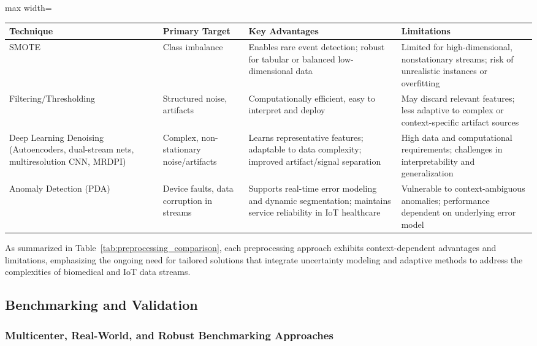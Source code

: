 \documentclass[sigconf]{acmart}
\begin{document}
\begin{table*}[htbp]
\centering
\caption{Comparison of Preprocessing Techniques for Biomedical and IoT Data}
\label{tab:preprocessing_comparison}
\begin{adjustbox}{max width=\textwidth}
\begin{tabular}{@{}llll@{}}
\toprule
\textbf{Technique} & \textbf{Primary Target} & \textbf{Key Advantages} & \textbf{Limitations} \\
\midrule
SMOTE & Class imbalance & Enables rare event detection; robust for tabular or balanced low-dimensional data & Limited for high-dimensional, nonstationary streams; risk of unrealistic instances or overfitting\\
Filtering/Thresholding & Structured noise, artifacts & Computationally efficient, easy to interpret and deploy & May discard relevant features; less adaptive to complex or context-specific artifact sources\\
Deep Learning Denoising (Autoencoders, dual-stream nets, multiresolution CNN, MRDPI) & Complex, non-stationary noise/artifacts & Learns representative features; adaptable to data complexity; improved artifact/signal separation~\cite{ref96,ref97,ref102} & High data and computational requirements; challenges in interpretability and generalization\\
Anomaly Detection (PDA) & Device faults, data corruption in streams & Supports real-time error modeling and dynamic segmentation; maintains service reliability in IoT healthcare~\cite{ref90,ref106} & Vulnerable to context-ambiguous anomalies; performance dependent on underlying error model\\
\bottomrule
\end{tabular}
\end{adjustbox}
\end{table*}

As summarized in Table~\ref{tab:preprocessing_comparison}, each preprocessing approach exhibits context-dependent advantages and limitations, emphasizing the ongoing need for tailored solutions that integrate uncertainty modeling and adaptive methods to address the complexities of biomedical and IoT data streams.

\subsection{Benchmarking and Validation}

\subsubsection{Multicenter, Real-World, and Robust Benchmarking Approaches}
\end{document}
